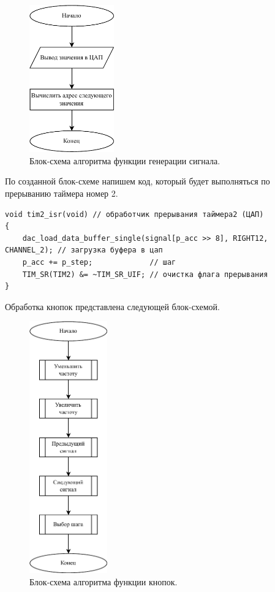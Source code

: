 	\begin{figure}[H]
    \centering
    \includegraphics[width=0.325\textwidth]{../image/dac.pdf}
    \caption{Блок-схема алгоритма функции генерации сигнала.}
	\end{figure}
	
	По созданной блок-схеме напишем код, который будет выполняться по прерыванию таймера номер 2.
	
\begin{code}
\begin{verbatim}
void tim2_isr(void) // обработчик прерывания таймера2 (ЦАП)
{
    dac_load_data_buffer_single(signal[p_acc >> 8], RIGHT12, CHANNEL_2); // загрузка буфера в цап
    p_acc += p_step;             // шаг
    TIM_SR(TIM2) &= ~TIM_SR_UIF; // очистка флага прерывания
}
\end{verbatim}
\end{code}
	
	Обработка кнопок представлена следующей блок-схемой.	
	
	\begin{figure}[H]
    \centering
    \includegraphics[width=0.3\textwidth]{../image/buttons.pdf}
    \caption{Блок-схема алгоритма функции кнопок.}
	\end{figure}
	
